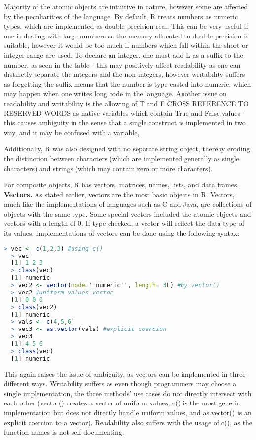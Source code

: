 \documentclass[12pt]{article}
\begin{document}
Majority of the atomic objects are intuitive in nature, however some are affected by the peculiarities of the language. By default, R treats numbers as numeric types, which are implemented as double precision real. This can be very useful if one is dealing with large numbers as the memory allocated to double precision is suitable, however it would be too much if numbers which fall within the short or integer range are used. To declare an integer, one must add L as a suffix to the number, as seen in the table - this may positively affect readability as one can distinctly separate the integers and the non-integers, however writability suffers as forgetting the suffix means that the number is type casted into numeric, which may happen when one writes long code in the language. Another issue on readability and writability is the allowing of T and F CROSS REFERENCE TO RESERVED WORDS as native variables which contain True and False values - this causes ambiguity in the sense that a single construct is implemented in two way, and it may be confused with a variable,


Additionally, R was also designed with no separate string object, thereby eroding the distinction between characters (which are implemented generally as single characters) and strings (which may contain zero or more characters).

For composite objects, R has vectors, matrices, names, lists, and data frames. \\

\textbf{Vectors.} As stated earlier, vectors are the most basic objects in R. Vectors, much like the implementations of languages such as C and Java, are collections of objects with the same type. Some special vectors included the atomic objects and vectors with a length of 0. If type-checked, a vector will reflect the data type of its values. Implementations of vectors can be done using the following syntax:

\begin{lstlisting}[language=R]
  > vec <- c(1,2,3) #using c()
  > vec
  [1] 1 2 3
  > class(vec)
  [1] numeric
  > vec2 <- vector(mode=''numeric'', length= 3L) #by vector()
  > vec2 #uniform values vector
  [1] 0 0 0
  > class(vec2)
  [1] numeric
  > vals <- c(4,5,6)
  > vec3 <- as.vector(vals) #explicit coercion
  > vec3
  [1] 4 5 6
  > class(vec)
  [1] numeric
\end{lstlisting}

This again raises the issue of ambiguity, as vectors can be implemented in three different ways. Writability suffers as even though programmers may choose a single implementation, the three methods' use cases do not directly intersect with each other (vector() creates a vector of uniform values, c() is the most generic implementation but does not directly handle uniform values, and as.vector() is an explicit coercion to a vector). Readability also suffers with the usage of c(), as the function names is not self-documenting.\\
\end{document}
